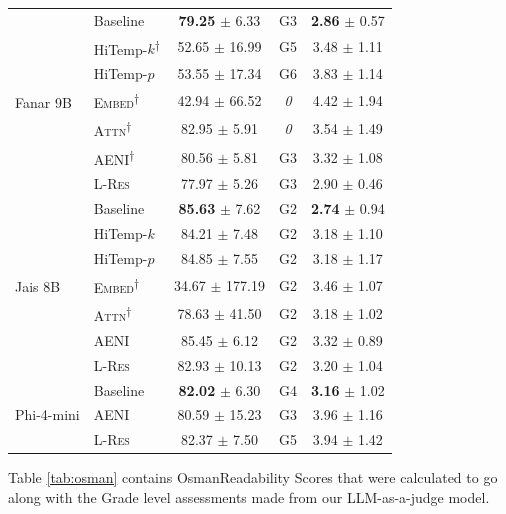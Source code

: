 \documentclass[11pt]{article}
\begin{document}
\begin{table}[t]
\begin{tabular}{l l c c c}
\midrule
\multirow{7}{*}{Fanar 9B}
  & Baseline
    & \textbf{79.25} $\pm$ 6.33  & G3 & \textbf{2.86} $\pm$ 0.57 \\
  & HiTemp-$k$\textsuperscript{$\dagger$}
    & 52.65 $\pm$ 16.99 & G5 & 3.48 $\pm$ 1.11 \\
  & HiTemp-$p$
    & 53.55 $\pm$ 17.34 & G6 & 3.83 $\pm$ 1.14 \\
  \cmidrule(l){2-5}
  & \textsc{Embed}\textsuperscript{$\dagger$}
    & 42.94 $\pm$ 66.52  & \textit{0} & 4.42 $\pm$ 1.94 \\
  & \textsc{Attn}\textsuperscript{$\dagger$}
    & 82.95 $\pm$ 5.91   & \textit{0} & 3.54 $\pm$ 1.49 \\
  & \textsc{AENI}\textsuperscript{$\dagger$}
    & 80.56 $\pm$ 5.81   & G3 & 3.32 $\pm$ 1.08 \\
  & \textsc{L-Res}
    & 77.97 $\pm$ 5.26   & G3 & 2.90 $\pm$ 0.46 \\
\midrule
\multirow{7}{*}{Jais 8B}
  & Baseline
    & \textbf{85.63} $\pm$ 7.62 & G2 & \textbf{2.74} $\pm$ 0.94 \\
  & HiTemp-$k$
    & 84.21 $\pm$ 7.48  & G2 & 3.18 $\pm$ 1.10 \\
  & HiTemp-$p$
    & 84.85 $\pm$ 7.55  & G2 & 3.18 $\pm$ 1.17 \\
  \cmidrule(l){2-5}
  & \textsc{Embed}\textsuperscript{$\dagger$}
    & 34.67 $\pm$ 177.19 & G2 & 3.46 $\pm$ 1.07 \\
  & \textsc{Attn}\textsuperscript{$\dagger$}
    & 78.63 $\pm$ 41.50  & G2 & 3.18 $\pm$ 1.02 \\
  & \textsc{AENI}
    & 85.45 $\pm$ 6.12   & G2 & 3.32 $\pm$ 0.89 \\
  & \textsc{L-Res}
    & 82.93 $\pm$ 10.13  & G2 & 3.20 $\pm$ 1.04 \\
\midrule
\multirow{3}{*}{Phi-4-mini}
  & Baseline
    & \textbf{82.02} $\pm$ 6.30 & G4 & \textbf{3.16} $\pm$ 1.02 \\
  \cmidrule(l){2-5}
  & \textsc{AENI}
    & 80.59 $\pm$ 15.23 & G3 & 3.96 $\pm$ 1.16 \\
  & \textsc{L-Res}
    & 82.37 $\pm$ 7.50  & G5 & 3.94 $\pm$ 1.42 \\
\bottomrule
\end{tabular}
\end{table}

Table \ref{tab:osman} contains OsmanReadability Scores \cite{el-haj-rayson-2016-osman} that were calculated to go along with the Grade level assessments made from our LLM-as-a-judge model.
\end{document}
